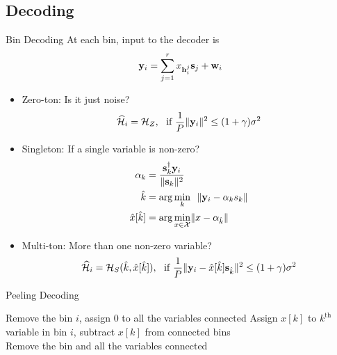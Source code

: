 \documentclass[10pt]{beamer}
\begin{document}
\subsection{Decoding}
\begin{frame}{Bin Decoding}
At each bin, input to the decoder is 
\begin{equation*}
 \mathbf{y}_i=\sum_{j=1}^{r}x_{\mathbf{h}_{i}^{j}}\mathbf{s}_j+\mathbf{w}_i
\end{equation*}
\begin{itemize}
\item Zero-ton: Is it just noise?
\begin{equation*}
\widehat{\mathcal{H}}_i=\mathcal{H}_{Z}, ~~\text{if } \frac{1}{P}\lVert{\mathbf{y}_i}\rVert^2\leq (1+\gamma)\sigma^2
\end{equation*}
\item Singleton: If a single variable is non-zero?
\begin{align*}
\alpha_{k}&=\frac{\mathbf{s}_k^{\dagger}\mathbf{y}_i}{\lVert{\mathbf{s}_k}\rVert^2}\\
\hat{k}&=\arg \min_{k}~~ \lVert{\mathbf{y}_i-\alpha_{k}s_k}\rVert\\
\hat{x}[\hat{k}]&=\arg \min_{x\in\mathcal{X}} \lVert{x-\alpha_{\hat{k}}}\rVert
\end{align*}
\item Multi-ton: More than one non-zero variable?
\begin{equation*}
\widehat{\mathcal{H}}_i=\mathcal{H}_{S}(\hat{k},\hat{x}[\hat{k}]), ~~\text{if } \frac{1}{P}\lVert{\mathbf{y}_{i}-\hat{x}[\hat{k}]\mathbf{s}_{\hat{k}}}\rVert^2\leq (1+\gamma)\sigma^2
\end{equation*}
\end{itemize}
\end{frame}

\begin{frame}{Peeling Decoding}
\begin{algorithmic}
    \State Remove the bin $i$, assign $0$ to all the variables connected
       \State Assign $x[k]$ to $k^{\text{th}}$ variable in bin $i$, subtract $x[k]$ from connected bins\\
                         \hspace{6ex} Remove the bin and all the variables connected
\EndIf
\EndWhile
\end{algorithmic}
\end{frame}
\end{document}
